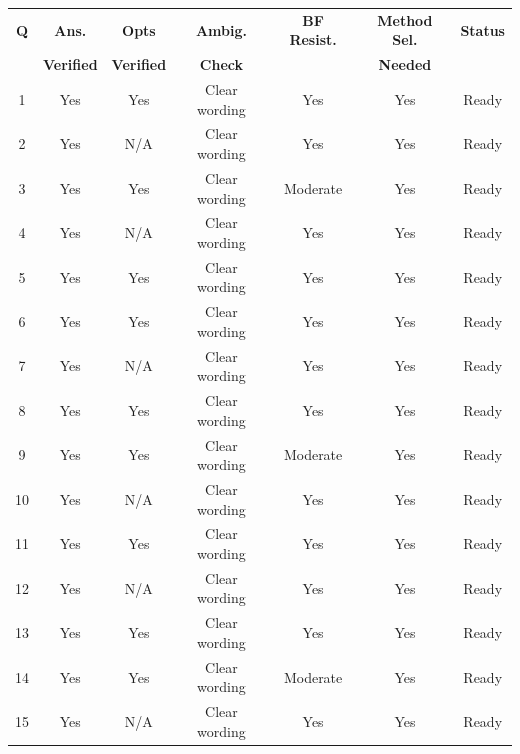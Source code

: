 \documentclass[11pt,a4paper]{article}
\begin{document}
\begin{center}
\renewcommand{\arraystretch}{1.15}
\begin{tabular}{|c|c|c|c|c|c|c|}
\hline
\textbf{Q} & \textbf{Ans.} & \textbf{Opts} & \textbf{Ambig.} & \textbf{BF Resist.} & \textbf{Method Sel.} & \textbf{Status} \\
 & \textbf{Verified} & \textbf{Verified} & \textbf{Check} & & \textbf{Needed} & \\
\hline
1 & Yes & Yes & Clear wording & Yes & Yes & Ready \\
2 & Yes & N/A & Clear wording & Yes & Yes & Ready \\
3 & Yes & Yes & Clear wording & Moderate & Yes & Ready \\
4 & Yes & N/A & Clear wording & Yes & Yes & Ready \\
5 & Yes & Yes & Clear wording & Yes & Yes & Ready \\
6 & Yes & Yes & Clear wording & Yes & Yes & Ready \\
7 & Yes & N/A & Clear wording & Yes & Yes & Ready \\
8 & Yes & Yes & Clear wording & Yes & Yes & Ready \\
9 & Yes & Yes & Clear wording & Moderate & Yes & Ready \\
10 & Yes & N/A & Clear wording & Yes & Yes & Ready \\
11 & Yes & Yes & Clear wording & Yes & Yes & Ready \\
12 & Yes & N/A & Clear wording & Yes & Yes & Ready \\
13 & Yes & Yes & Clear wording & Yes & Yes & Ready \\
14 & Yes & Yes & Clear wording & Moderate & Yes & Ready \\
15 & Yes & N/A & Clear wording & Yes & Yes & Ready \\
\hline
\end{tabular}
\end{center}
\end{document}
